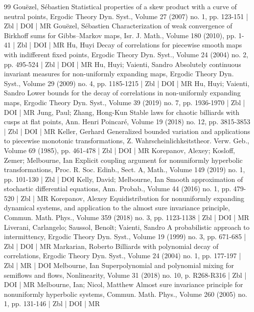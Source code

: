 \begin{thebibliography}{99}
Gouëzel, Sébastien Statistical properties of a skew product with a curve of neutral points, Ergodic Theory Dyn. Syst., Volume 27 (2007) no. 1, pp. 123-151 | Zbl | DOI | MR
Gouëzel, Sébastien Characterization of weak convergence of Birkhoff sums for Gibbs–Markov maps, Isr. J. Math., Volume 180 (2010), pp. 1-41 | Zbl | DOI | MR
Hu, Huyi Decay of correlations for piecewise smooth maps with indifferent fixed points, Ergodic Theory Dyn. Syst., Volume 24 (2004) no. 2, pp. 495-524 | Zbl | DOI | MR
Hu, Huyi; Vaienti, Sandro Absolutely continuous invariant measures for non-uniformly expanding maps, Ergodic Theory Dyn. Syst., Volume 29 (2009) no. 4, pp. 1185-1215 | Zbl | DOI | MR
Hu, Huyi; Vaienti, Sandro Lower bounds for the decay of correlations in non-uniformly expanding maps, Ergodic Theory Dyn. Syst., Volume 39 (2019) no. 7, pp. 1936-1970 | Zbl | DOI | MR
Jung, Paul; Zhang, Hong-Kun Stable laws for chaotic billiards with cusps at flat points, Ann. Henri Poincaré, Volume 19 (2018) no. 12, pp. 3815-3853 | Zbl | DOI | MR
Keller, Gerhard Generalized bounded variation and applications to piecewise monotonic transformations, Z. Wahrscheinlichkeitstheor. Verw. Geb., Volume 69 (1985), pp. 461-478 | Zbl | DOI | MR
Korepanov, Alexey; Kosloff, Zemer; Melbourne, Ian Explicit coupling argument for nonuniformly hyperbolic transformations, Proc. R. Soc. Edinb., Sect. A, Math., Volume 149 (2019) no. 1, pp. 101-130 | Zbl | DOI
Kelly, David; Melbourne, Ian Smooth approximation of stochastic differential equations, Ann. Probab., Volume 44 (2016) no. 1, pp. 479-520 | Zbl | MR
Korepanov, Alexey Equidistribution for nonuniformly expanding dynamical systems, and application to the almost sure invariance principle, Commun. Math. Phys., Volume 359 (2018) no. 3, pp. 1123-1138 | Zbl | DOI | MR
Liverani, Carlangelo; Saussol, Benoît; Vaienti, Sandro A probabilistic approach to intermittency, Ergodic Theory Dyn. Syst., Volume 19 (1999) no. 3, pp. 671-685 | Zbl | DOI | MR
Markarian, Roberto Billiards with polynomial decay of correlations, Ergodic Theory Dyn. Syst., Volume 24 (2004) no. 1, pp. 177-197 | Zbl | MR | DOI
Melbourne, Ian Superpolynomial and polynomial mixing for semiflows and flows, Nonlinearity, Volume 31 (2018) no. 10, p. R268-R316 | Zbl | DOI | MR
Melbourne, Ian; Nicol, Matthew Almost sure invariance principle for nonuniformly hyperbolic systems, Commun. Math. Phys., Volume 260 (2005) no. 1, pp. 131-146 | Zbl | DOI | MR

\end{thebibliography}
